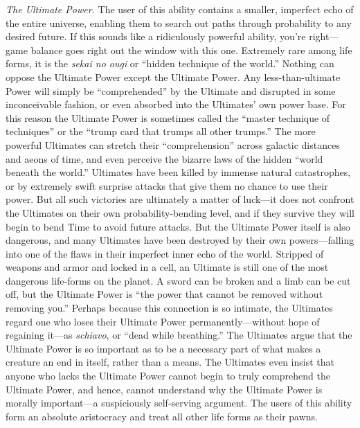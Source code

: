 {
  \textit{The Ultimate Power.} The user of this ability contains a
smaller, imperfect echo of the entire universe, enabling them to search
out paths through probability to any desired future. If this sounds
like a ridiculously powerful ability, you're
right---game balance goes right out the window with this one. Extremely
rare among life forms, it is the \textit{sekai no ougi} or
``hidden technique of the world.''
Nothing can oppose the Ultimate Power except the Ultimate Power. Any
less-than-ultimate Power will simply be
``comprehended'' by the Ultimate and
disrupted in some inconceivable fashion, or even absorbed into the
Ultimates' own power base. For this reason the Ultimate
Power is sometimes called the ``master technique of
techniques'' or the ``trump card
that trumps all other trumps.'' The more powerful
Ultimates can stretch their
``comprehension'' across galactic
distances and aeons of time, and even perceive the bizarre laws of the
hidden ``world beneath the world.''
Ultimates have been killed by immense natural catastrophes, or by
extremely swift surprise attacks that give them no chance to use their
power. But all such victories are ultimately a matter of luck---it does
not confront the Ultimates on their own probability-bending level, and
if they survive they will begin to bend Time to avoid future attacks.
But the Ultimate Power itself is also dangerous, and many Ultimates
have been destroyed by their own powers---falling into one of the flaws
in their imperfect inner echo of the world. Stripped of weapons and
armor and locked in a cell, an Ultimate is still one of the most
dangerous life-forms on the planet. A sword can be broken and a limb
can be cut off, but the Ultimate Power is ``the power
that cannot be removed without removing you.''
Perhaps because this connection is so intimate, the Ultimates regard
one who loses their Ultimate Power permanently---without hope of
regaining it---as \textit{schiavo}, or ``dead while
breathing.'' The Ultimates argue that the Ultimate
Power is so important as to be a necessary part of what makes a
creature an end in itself, rather than a means. The Ultimates even
insist that anyone who lacks the Ultimate Power cannot begin to truly
comprehend the Ultimate Power, and hence, cannot understand why the
Ultimate Power is morally important---a suspiciously self-serving
argument. The users of this ability form an absolute aristocracy and
treat all other life forms as their pawns. }

\myendsectiontext



